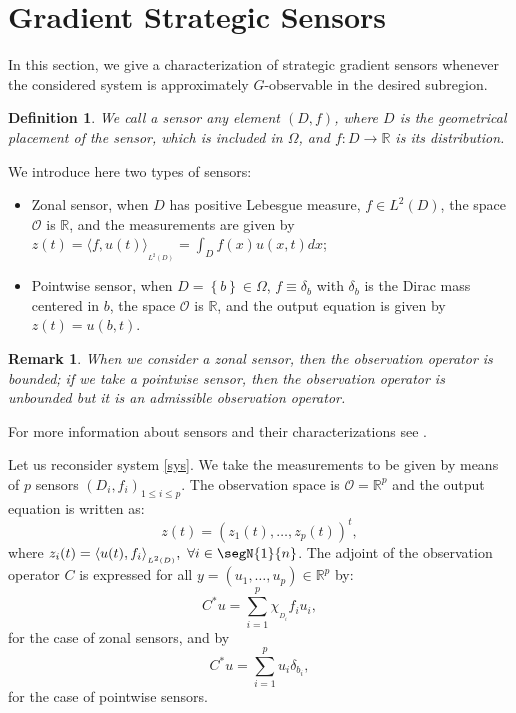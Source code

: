\documentclass{article}
\newtheorem{definition}[theorem]{Definition}
\newtheorem{remark}[theorem]{Remark}
\begin{document}

\section{Gradient Strategic Sensors}
\label{sec:4}

In this section, we give a characterization of strategic gradient sensors 
whenever the considered system is approximately $G$-observable 
in the desired subregion.

\begin{definition}
We call a sensor any element $(D,f)$, where $D$ is the geometrical placement 
of the sensor, which is included in $\Omega$, 
and $f: D\rightarrow \mathbb{R}$ is its distribution. 
 \end{definition}

We introduce here two types of sensors:
\begin{itemize}
\item Zonal sensor, when $D$ has positive Lebesgue measure, $f\in L^2(D)$,
the space $\mathcal{O}$ is $\mathbb{R}$, and the measurements are given by 
$z(t)=\langle f,u(t)\rangle_{_{L^2(D)}} = \displaystyle\int_{D}f(x)u(x,t)dx$;

\item Pointwise sensor, when $D=\left\{b\right\}\in \Omega$, $f \equiv \delta_b$ 
with $\delta_b$ is the Dirac mass centered in $b$, 
the space $\mathcal{O}$ is $\mathbb{R}$, and the output equation 
is given by $z(t) =  u(b,t)$. 
\end{itemize}

\begin{remark}
When we consider a zonal sensor, then the observation operator is bounded; 
if we take a pointwise sensor, then the observation operator is unbounded 
but it is an admissible observation operator.
\end{remark}

For more information about sensors and their characterizations 
see \cite{Jai.Prit,regional.analysis,sensor.2002}. 

Let us reconsider system \eqref{sys}. We take the measurements to be given 
by means of $p$ sensors $\left(D_i,f_i\right)_{1\leq i\leq p}$. The observation 
space is $\mathcal{O}=\mathbb{R}^p$ and the output equation is written as:
\begin{equation}
\label{out.p}
z(t) = \left(z_1(t), \ldots , z_p(t)\right)^t,
\end{equation}
where $z_i(t) = \langle u(t),
f_i\rangle_{_{L^2(D)}}, \ \forall i\in \segN{1}{n}$.
The adjoint of the observation operator $C$ is expressed 
for all $y=(u_1,\ldots,u_p)\in\mathbb{R}^p$ by:
\begin{equation}
\label{C*z}
C^*u  = \displaystyle\sum_{i=1}^{p}\chi_{_{D_i}}f_iu_i, 
\end{equation}
for the case of zonal sensors, and by
\begin{equation}
\label{C*p}
C^*u  = \displaystyle\sum_{i=1}^{p}u_i\delta_{b_i},
\end{equation}
for the case of pointwise sensors.
\end{document}

